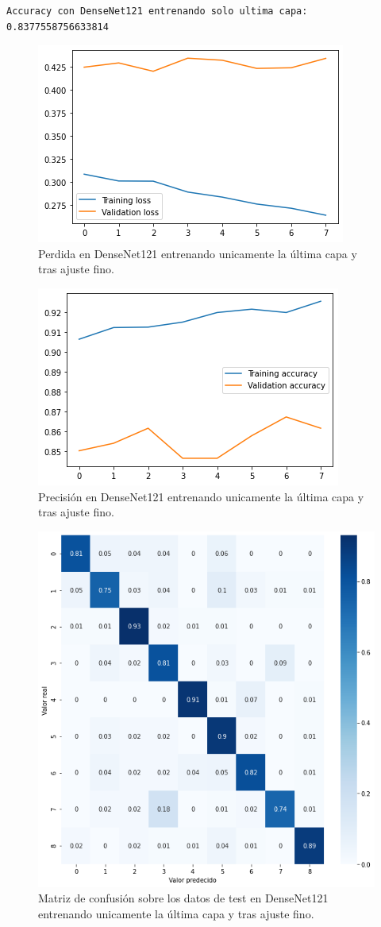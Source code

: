 \begin{lstlisting}
Accuracy con DenseNet121 entrenando solo ultima capa: 0.8377558756633814
\end{lstlisting}





\begin{figure}[H]
  \centering
  \includegraphics[width=0.5\linewidth]{Imagenes/entrenamiento_redes/ult/densenet_fine_loss.png}
  \caption{Perdida en DenseNet121 entrenando unicamente la última capa y tras ajuste fino.}
\end{figure}

\begin{figure}[H]
  \centering
  \includegraphics[width=0.5\linewidth]{Imagenes/entrenamiento_redes/ult/densenet_fine_acc.png}
  \caption{Precisión en DenseNet121 entrenando unicamente la última capa y tras ajuste fino.}
\end{figure}

\begin{figure}[H]
  \centering
  \includegraphics[width=0.5\linewidth]{Imagenes/entrenamiento_redes/ult/densenet_fine_matriz.png}
  \caption{Matriz de confusión sobre los datos de test en DenseNet121 entrenando unicamente la última capa y tras ajuste fino.}
\end{figure}


